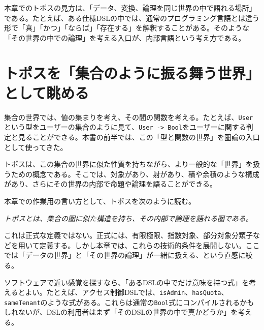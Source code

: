 \begin{intuitionbox}
本章でのトポスの見方は、「データ、変換、論理を同じ世界の中で語れる場所」である。たとえば、ある仕様DSLの中では、通常のプログラミング言語とは違う形で「真」「かつ」「ならば」「存在する」を解釈することがある。そのような「その世界の中での論理」を考える入口が、内部言語という考え方である。
\end{intuitionbox}


\section{トポスを「集合のように振る舞う世界」として眺める}

集合の世界では、値の集まりを考え、その間の関数を考える。たとえば、\texttt{User}という型をユーザーの集合のように見て、\texttt{User -> Bool}をユーザーに関する判定と見ることができる。本書の前半では、この「型と関数の世界」を圏論の入口として使ってきた。

トポスは、この集合の世界に似た性質を持ちながら、より一般的な「世界」を扱うための概念である。そこでは、対象があり、射があり、積や余積のような構成があり、さらにその世界の内部で命題や論理を語ることができる。

\begin{definitionbox}
本章での作業用の言い方として、トポスを次のように読む。

\medskip

\emph{トポスとは、集合の圏に似た構造を持ち、その内部で論理を語れる圏である。}

\medskip

これは正式な定義ではない。正式には、有限極限、指数対象、部分対象分類子などを用いて定義する。しかし本章では、これらの技術的条件を展開しない。ここでは「データの世界」と「その世界の論理」が一緒に扱える、という直感に絞る。
\end{definitionbox}

\begin{softwarebox}
ソフトウェアで近い感覚を探すなら、「あるDSLの中でだけ意味を持つ式」を考えるとよい。たとえば、アクセス制御DSLでは、\texttt{isAdmin}、\texttt{hasQuota}、\texttt{sameTenant}のような式がある。これらは通常の\texttt{Bool}式にコンパイルされるかもしれないが、DSLの利用者はまず「そのDSLの世界の中で真かどうか」を考える。
\end{softwarebox}

